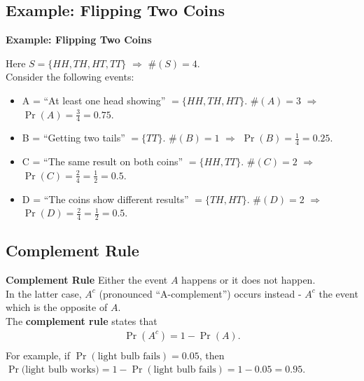 \documentclass[compress]{beamer}        %
\makeatletter
\newcommand{\tcb}{\textcolor{beamer@blendedblue}}
\makeatother
\begin{document}
\subsection{Example: Flipping Two Coins}
\begin{frame}{\bf \tcb{Example: Flipping Two Coins}}

Here $S = \{HH, TH, HT, TT\}$ $\Rightarrow$ $\#(S) = 4$.\\[0.4cm]
Consider the following events:\\[0.1cm]
\begin{itemize}\itemsep0.6cm
\item A = ``At least one head showing'' $= \{HH, TH, HT\}$.\newline
$\#(A) = 3$ $\Rightarrow$ $\Pr(A) = \tfrac{3}{4} = 0.75$.
\item B = ``Getting two tails'' $= \{TT\}$.\newline
$\#(B) = 1$ $\Rightarrow$ $\Pr(B) = \tfrac{1}{4} = 0.25$.
\item C = ``The same result on both coins'' $= \{HH, TT\}$.\newline
$\#(C) = 2$ $\Rightarrow$ $\Pr(C) = \tfrac{2}{4} = \tfrac{1}{2} = 0.5$.
\item D = ``The coins show different results'' $= \{TH, HT\}$.\newline
$\#(D) = 2$ $\Rightarrow$ $\Pr(D) = \tfrac{2}{4} = \tfrac{1}{2} = 0.5$.
\end{itemize}

\end{frame}



\subsection{Complement Rule}
\begin{frame}{\bf \tcb{Complement Rule}}
Either the event $A$ happens or it does not happen.\\[0.8cm]
In the latter case, $A^c$ (pronounced ``A-complement'') occurs instead - $A^c$ the event which is the opposite of $A$.\\[0.8cm]
The {\bf complement rule} states that
\begin{align*}
\boxed{\Pr(A^c) = 1 - \Pr(A)}.\\[-0.2cm]
\end{align*}
For example, if $\Pr(\text{light bulb fails}) = 0.05$, then $\Pr(\text{light bulb works)} = 1 - \Pr(\text{light bulb fails}) = 1 - 0.05 = 0.95.$
\end{frame}
\end{document}
